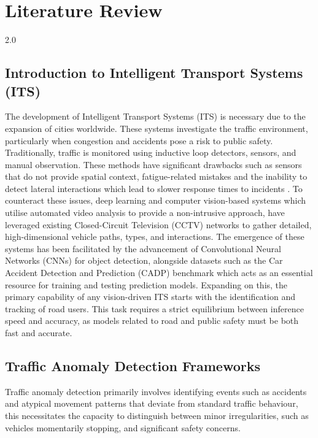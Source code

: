 
\chapter{Literature Review}
\label{ch:lit_review}
\begin{spacing}{2.0}


\section{Introduction to Intelligent Transport Systems (ITS)}
The development of Intelligent Transport Systems (ITS) is necessary due to the expansion of cities worldwide. These systems investigate the traffic environment, particularly when congestion and accidents pose a risk to public safety. Traditionally, traffic is monitored using inductive loop detectors, sensors, and manual observation. These methods have significant drawbacks such as sensors that do not provide spatial context, fatigue-related mistakes and the inability to detect lateral interactions which lead to slower response times to incidents \cite{robles-serrano_automatic_2021}. To counteract these issues, deep learning and computer vision-based systems which utilise automated video analysis to provide a non-intrusive approach, have leveraged existing Closed-Circuit Television (CCTV) networks to gather detailed, high-dimensional vehicle paths, types, and interactions. The emergence of these systems has been facilitated by the advancement of Convolutional Neural Networks (CNNs) for object detection, alongside datasets such as the Car Accident Detection and Prediction (CADP) benchmark which acts as an essential resource for training and testing prediction models. Expanding on this, the primary capability of any vision-driven ITS starts with the identification and tracking of road users. This task requires a strict equilibrium between inference speed and accuracy, as models related to road and public safety must be both fast and accurate.

\section{Traffic Anomaly Detection Frameworks}
Traffic anomaly detection primarily involves identifying events such as accidents and atypical movement patterns that deviate from standard traffic behaviour, this necessitates the capacity to distinguish between minor irregularities, such as vehicles momentarily stopping, and significant safety concerns.


\end{spacing}
